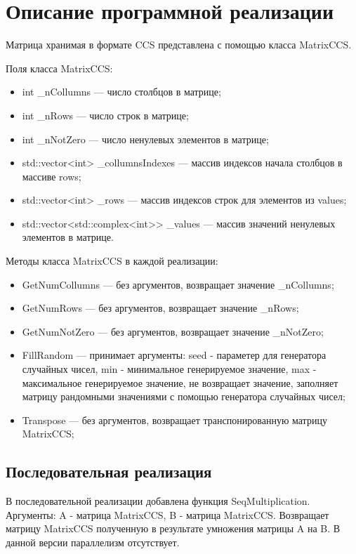 \documentclass{report}
\begin{document}
\section*{Описание программной реализации}
\par Матрица хранимая в формате CCS представлена с помощью класса MatrixCCS.
\par Поля класса MatrixCCS:
\begin{itemize}
	\item int \_nCollumns — число столбцов в матрице;
	\item int \_nRows — число строк в матрице;
	\item int \_nNotZero — число ненулевых элементов в матрице;
	\item std::vector<int> \_collumnsIndexes — массив индексов начала столбцов в массиве rows;
	\item std::vector<int> \_rows — массив индексов строк для элементов из values;
	\item std::vector<std::complex<int>> \_values — массив значений ненулевых элементов в матрице.
\end{itemize}
\par Методы класса MatrixCCS в каждой реализации:
\begin{itemize}
	\item GetNumCollumns — без аргументов, возвращает значение \_nCollumns;
	\item GetNumRows — без аргументов, возвращает значение \_nRows;
	\item GetNumNotZero — без аргументов, возвращает значение \_nNotZero;
	\item FillRandom — принимает аргументы: seed - параметер для генератора случайных чисел, min - минимальное генерируемое значение, max - максимальное генерируемое значение, не возвращает значение, заполняет матрицу рандомными значениями с помощью генератора случайных чисел;
	\item Transpose — без аргументов, возвращает транспонированную матрицу MatrixCCS;
\end{itemize}

\subsection*{Последовательная реализация}
\par В последовательной реализации добавлена функция SeqMultiplication. Аргументы: A - матрица MatrixCCS, B - матрица MatrixCCS. Возвращает матрицу MatrixCCS полученную в результате умножения матрицы A на B. В данной версии параллелизм отсутствует.
\end{document}
